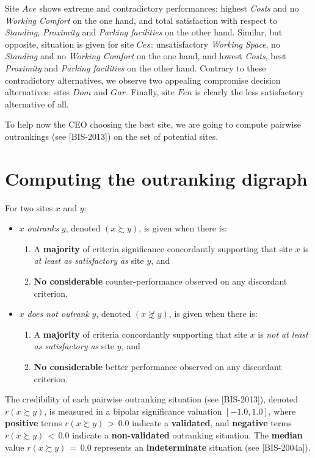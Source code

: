 Site $Ave$ shows extreme and contradictory performances: highest \emph{Costs} and no \emph{Working Comfort} on the one hand, and total satisfaction with respect to \emph{Standing}, \emph{Proximity} and \emph{Parking facilities} on the other hand. Similar, but opposite, situation is given for site $Ces$: unsatisfactory \emph{Working Space}, no \emph{Standing} and no \emph{Working Comfort} on the one hand, and lowest \emph{Costs}, best \emph{Proximity} and \emph{Parking facilities} on the other hand. Contrary to these contradictory alternatives, we observe two appealing compromise decision alternatives: sites $Dom$ and $Gar$. Finally, site $Fen$ is clearly the less satisfactory alternative of all.

To help now the CEO choosing the best site, we are going to compute pairwise outrankings (see [BIS-2013]) on the set of potential sites.


\section{Computing the outranking digraph}
\label{sec:6.2}

For two sites $x$ and $y$:
\begin{itemize}
\item $x$ \emph{outranks} $y$, denoted $(x \succsim y)$, is given when there is:
   \begin{enumerate}
     \item A \textbf{majority} of criteria significance concordantly supporting that site $x$ is \emph{at least as satisfactory as} site $y$, and
    \item \textbf{No considerable} counter-performance observed on any discordant criterion.
    \end{enumerate}
\item $x$ \emph{does not outrank} $y$, denoted $(x \not\succsim y)$, is given when there is:
   \begin{enumerate}
    \item A \textbf{majority} of criteria concordantly supporting that site $x$ is \emph{not at least as satisfactory as} site $y$, and
    \item \textbf{No considerable} better performance observed on any discordant criterion.
    \end{enumerate}
\end{itemize}

The credibility of each pairwise outranking situation (see [BIS-2013]), denoted $r(x \succsim y)$, is measured in a bipolar significance valuation $[-1.0, 1.0]$, where \textbf{positive} terms $r(x \succsim y)\, >\, 0.0$ indicate a \textbf{validated}, and \textbf{negative} terms $r(x \succsim y)\, <\, 0.0$ indicate a \textbf{non-validated} outranking situation. The \textbf{median} value $r(x \succsim y)\, = \,0.0$ represents an \textbf{indeterminate} situation (see [BIS-2004a]).   

